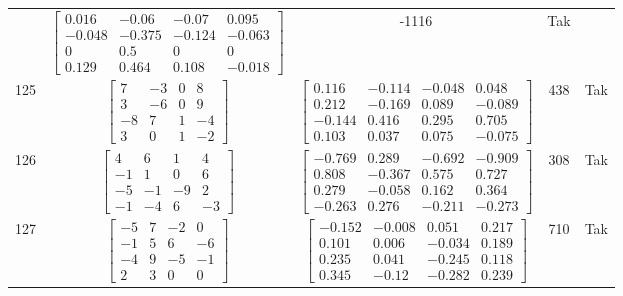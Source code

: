 \documentclass[a4paper,12pt]{article}
\begin{document}
\begin{tabular}{c c c c c}
&
$\begin{bmatrix} 0.016 & -0.06 & -0.07 & 0.095 \\ -0.048 & -0.375 & -0.124 & -0.063 \\ 0 & 0.5 & 0 & 0 \\ 0.129 & 0.464 & 0.108 & -0.018 \end{bmatrix}$
&
-1116
&
Tak
\\
125
&
$\begin{bmatrix} 7 & -3 & 0 & 8 \\ 3 & -6 & 0 & 9 \\ -8 & 7 & 1 & -4 \\ 3 & 0 & 1 & -2 \end{bmatrix}$
&
$\begin{bmatrix} 0.116 & -0.114 & -0.048 & 0.048 \\ 0.212 & -0.169 & 0.089 & -0.089 \\ -0.144 & 0.416 & 0.295 & 0.705 \\ 0.103 & 0.037 & 0.075 & -0.075 \end{bmatrix}$
&
438
&
Tak
\\
126
&
$\begin{bmatrix} 4 & 6 & 1 & 4 \\ -1 & 1 & 0 & 6 \\ -5 & -1 & -9 & 2 \\ -1 & -4 & 6 & -3 \end{bmatrix}$
&
$\begin{bmatrix} -0.769 & 0.289 & -0.692 & -0.909 \\ 0.808 & -0.367 & 0.575 & 0.727 \\ 0.279 & -0.058 & 0.162 & 0.364 \\ -0.263 & 0.276 & -0.211 & -0.273 \end{bmatrix}$
&
308
&
Tak
\\
127
&
$\begin{bmatrix} -5 & 7 & -2 & 0 \\ -1 & 5 & 6 & -6 \\ -4 & 9 & -5 & -1 \\ 2 & 3 & 0 & 0 \end{bmatrix}$
&
$\begin{bmatrix} -0.152 & -0.008 & 0.051 & 0.217 \\ 0.101 & 0.006 & -0.034 & 0.189 \\ 0.235 & 0.041 & -0.245 & 0.118 \\ 0.345 & -0.12 & -0.282 & 0.239 \end{bmatrix}$
&
710
&
Tak
\\

\end{tabular}
\end{document}
